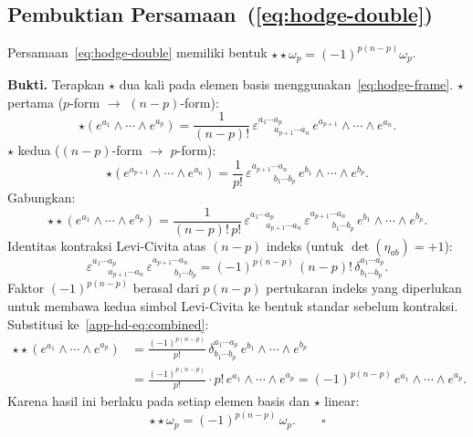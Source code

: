  
 
\subsection{Pembuktian Persamaan~(\ref{eq:hodge-double})}
\label{app:proof-hodge-double}
 
Persamaan~\eqref{eq:hodge-double} memiliki bentuk $\star\star\omega_p = (-1)^{p(n-p)}\omega_p$.
 
\bigskip\noindent\textbf{Bukti.} Terapkan $\star$ dua kali pada elemen basis menggunakan~\eqref{eq:hodge-frame}. $\star$ pertama ($p$-form $\to$ $(n-p)$-form):
\begin{equation}
    \star(e^{a_1} \wedge \cdots \wedge e^{a_p}) = \frac{1}{(n-p)!}\,\varepsilon^{a_1 \cdots a_p}_{\ \ \ \ \ \ \ \ a_{p+1} \cdots a_n}\,e^{a_{p+1}} \wedge \cdots \wedge e^{a_n}.
\end{equation}
$\star$ kedua ($(n-p)$-form $\to$ $p$-form):
\begin{equation}
    \star(e^{a_{p+1}} \wedge \cdots \wedge e^{a_n}) = \frac{1}{p!}\,\varepsilon^{a_{p+1} \cdots a_n}_{\ \ \ \ \ \ \ \ \ \ \ b_1 \cdots b_p}\,e^{b_1} \wedge \cdots \wedge e^{b_p}.
\end{equation}
Gabungkan:
\begin{equation}\label{app-hd-eq:combined}
    \star\star(e^{a_1} \wedge \cdots \wedge e^{a_p}) = \frac{1}{(n-p)!\,p!}\,\varepsilon^{a_1 \cdots a_p}_{\ \ \ \ \ \ \ \ a_{p+1} \cdots a_n}\,\varepsilon^{a_{p+1} \cdots a_n}_{\ \ \ \ \ \ \ \ \ \ \ b_1 \cdots b_p}\,e^{b_1} \wedge \cdots \wedge e^{b_p}.
\end{equation}
Identitas kontraksi Levi-Civita atas $(n-p)$ indeks (untuk $\det(\eta_{ab}) = +1$):
\begin{equation}\label{app-hd-eq:eps-identity}
    \varepsilon^{a_1 \cdots a_p}_{\ \ \ \ \ \ \ \ a_{p+1} \cdots a_n}\,\varepsilon^{a_{p+1} \cdots a_n}_{\ \ \ \ \ \ \ \ \ \ \ b_1 \cdots b_p} = (-1)^{p(n-p)}\,(n-p)!\,\delta^{a_1 \cdots a_p}_{b_1 \cdots b_p}.
\end{equation}
Faktor $(-1)^{p(n-p)}$ berasal dari $p(n-p)$ pertukaran indeks yang diperlukan untuk membawa kedua simbol Levi-Civita ke bentuk standar sebelum kontraksi. Substitusi ke~\eqref{app-hd-eq:combined}:
\begin{align}
    \star\star(e^{a_1} \wedge \cdots \wedge e^{a_p})
    &= \frac{(-1)^{p(n-p)}}{p!}\,\delta^{a_1 \cdots a_p}_{b_1 \cdots b_p}\,e^{b_1} \wedge \cdots \wedge e^{b_p} \nonumber\\[4pt]
    &= \frac{(-1)^{p(n-p)}}{p!}\cdot p!\,e^{a_1} \wedge \cdots \wedge e^{a_p} = (-1)^{p(n-p)}\,e^{a_1} \wedge \cdots \wedge e^{a_p}.
\end{align}
Karena hasil ini berlaku pada setiap elemen basis dan $\star$ linear:
\begin{equation}
    \star\star\omega_p = (-1)^{p(n-p)}\,\omega_p. \qquad\square
\end{equation}
 
